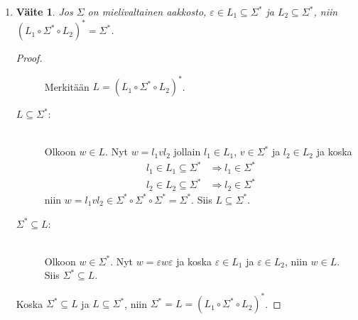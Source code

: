 \documentclass[a4paper,11pt,draft]{article}
\newtheorem*{claim}{Väite}
\begin{document}
\begin{enumerate}
\begin{enumerate}
\begin{proof}
\begin{description}
\begin{itemize}
\begin{itemize}
\begin{equation*}
            \end{equation*}
            Nyt siis
            \begin{equation*}
              u \in (\{b\} \circ \{a\}^*)^* \text{ ja }
              bu \in (\{b\} \circ \{a\}^*)^*
            \end{equation*}
            Joten $w = \varepsilon (bu) \in A$.
          \end{itemize}
        \end{itemize}
      \end{description}
      Olkoon sitten $w \in A$. Nyt $w = u_1 \ldots u_n$ missä $u_i \in
      \{a, b\}$ kaikilla $i$. Siten $w \in \{a,b\}^*$.

      On siis osoitettu, että $\{a,b\} \subseteq A$ ja $A \subseteq
      \{a,b\}^*$ joten joukot ovat samat.
    \end{proof}

  \item
    \begin{claim}
      Jos $\Sigma$ on mielivaltainen aakkosto, $\varepsilon \in L_1
      \subseteq \Sigma^*$ ja $L_2 \subseteq \Sigma^*$, niin $(L_1
      \circ \Sigma^* \circ L_2)^* = \Sigma^*$.
    \end{claim}
    \begin{proof}
      \begin{description}
      \item[]Merkitään $L = (L_1 \circ \Sigma^* \circ L_2)^*$.
      \item[$L \subseteq \Sigma^*$:]
        \hfill \\
        Olkoon $w \in L$. Nyt $w = l_1vl_2$ jollain $l_1 \in L_1$,
        $v \in \Sigma^*$ ja $l_2 \in L_2$ ja koska
        \begin{align*}
          l_1 \in L_1 \subseteq \Sigma^* &\Rightarrow l_1 \in
          \Sigma^* \\
          l_2 \in L_2 \subseteq \Sigma^* &\Rightarrow l_2 \in
          \Sigma^*
        \end{align*}
        niin $w = l_1vl_2 \in \Sigma^* \circ \Sigma^* \circ \Sigma^*
        = \Sigma^*$. Siis $L \subseteq \Sigma^*$.
      \item[$\Sigma^* \subseteq L$:]
        \hfill \\
        Olkoon $w \in \Sigma^*$. Nyt $w = \varepsilon w \varepsilon$
        ja koska $\varepsilon \in L_1$ ja $\varepsilon \in L_2$,
        niin $w \in L$. Siis $\Sigma^* \subseteq L$.
      \end{description}
      Koska $\Sigma^* \subseteq L$ ja $L \subseteq \Sigma^*$, niin
      $\Sigma^* = L = (L_1 \circ \Sigma^* \circ L_2)^*$.
    \end{proof}


\end{enumerate}
\end{enumerate}
\end{document}
